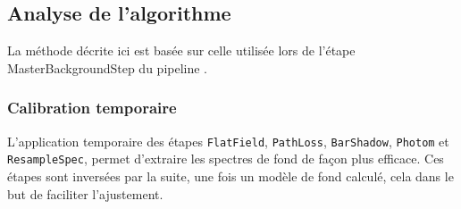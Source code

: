 \documentclass[12pt, a4paper]{article}
\begin{document}
\subsection{Analyse de l'algorithme}

La méthode décrite ici est basée sur celle utilisée lors de l'étape MasterBackgroundStep du pipeline .

\subsubsection{Calibration temporaire}

L'application temporaire des étapes \texttt{FlatField}, \texttt{PathLoss}, \texttt{BarShadow}, \texttt{Photom} et \texttt{ResampleSpec}, permet d'extraire les spectres de fond de façon plus efficace. Ces étapes sont inversées par la suite, une fois un modèle de fond calculé, cela dans le but de faciliter l'ajustement.
\end{document}
